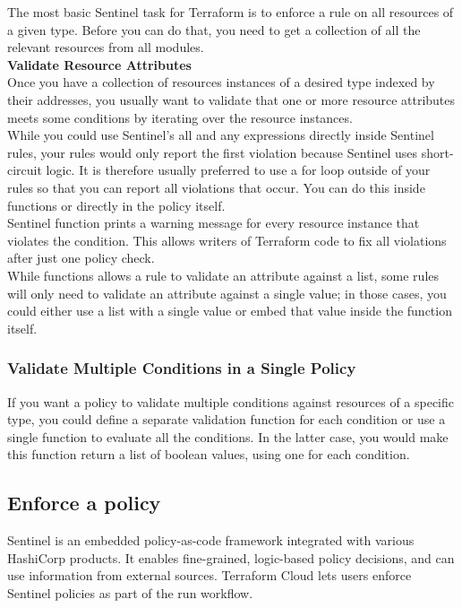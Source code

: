 \documentclass[12pt, letterpaper, twoside]{article}
\begin{document}
The most basic Sentinel task for Terraform is to enforce a rule on all resources of a given type. 
Before you can do that, you need to get a collection of all the relevant resources from all modules.\\

\textbf{Validate Resource Attributes}\\
Once you have a collection of resources instances of a desired type indexed by their addresses, you usually 
want to validate that one or more resource attributes meets some conditions by iterating over the resource 
instances.\\

While you could use Sentinel's all and any expressions directly inside Sentinel rules, your rules would 
only report the first violation because Sentinel uses short-circuit logic. It is therefore usually preferred 
to use a for loop outside of your rules so that you can report all violations that occur. You can do this 
inside functions or directly in the policy itself.\\

Sentinel function prints a warning message for every resource instance that violates the condition. 
This allows writers of Terraform code to fix all violations after just one policy check.\\

While functions allows a rule to validate an attribute against a list, some rules will only need to 
validate an attribute against a single value; in those cases, you could either use a list with 
a single value or embed that value inside the function itself.

\subsubsection{Validate Multiple Conditions in a Single Policy}
If you want a policy to validate multiple conditions against resources of a specific type, you 
could define a separate validation function for each condition or use a single function to evaluate 
all the conditions. In the latter case, you would make this function return a list of boolean 
values, using one for each condition.

\subsection{Enforce a policy}
Sentinel is an embedded policy-as-code framework integrated with various HashiCorp products. 
It enables fine-grained, logic-based policy decisions, and can use information from external sources. 
Terraform Cloud lets users enforce Sentinel policies as part of the run workflow.\\
\end{document}
